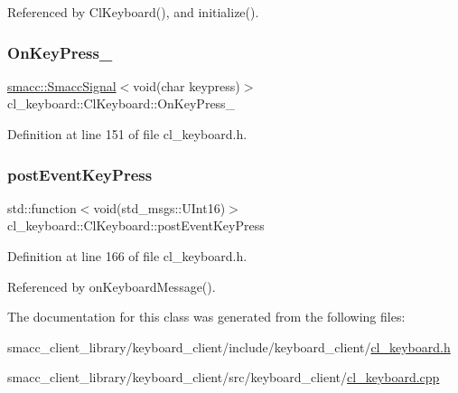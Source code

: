 Referenced by Cl\+Keyboard(), and initialize().

\mbox{\label{classcl__keyboard_1_1ClKeyboard_ae7fb61a86ed9cdd313f0cc1b2661c63c}} 
\subsubsection{\texorpdfstring{On\+Key\+Press\+\_\+}{OnKeyPress\_}}
{\footnotesize\ttfamily \hyperlink{classsmacc_1_1SmaccSignal}{smacc\+::\+Smacc\+Signal}$<$void(char keypress)$>$ cl\+\_\+keyboard\+::\+Cl\+Keyboard\+::\+On\+Key\+Press\+\_\+}



Definition at line 151 of file cl\+\_\+keyboard.\+h.

\mbox{\label{classcl__keyboard_1_1ClKeyboard_ae9811fd50207ba9b69a4f27e7f8b4e86}} 
\subsubsection{\texorpdfstring{post\+Event\+Key\+Press}{postEventKeyPress}}
{\footnotesize\ttfamily std\+::function$<$void(std\+\_\+msgs\+::\+U\+Int16)$>$ cl\+\_\+keyboard\+::\+Cl\+Keyboard\+::post\+Event\+Key\+Press}



Definition at line 166 of file cl\+\_\+keyboard.\+h.



Referenced by on\+Keyboard\+Message().



The documentation for this class was generated from the following files\+:\begin{DoxyCompactItemize}
\item 
smacc\+\_\+client\+\_\+library/keyboard\+\_\+client/include/keyboard\+\_\+client/\hyperlink{cl__keyboard_8h}{cl\+\_\+keyboard.\+h}\item 
smacc\+\_\+client\+\_\+library/keyboard\+\_\+client/src/keyboard\+\_\+client/\hyperlink{cl__keyboard_8cpp}{cl\+\_\+keyboard.\+cpp}\end{DoxyCompactItemize}
